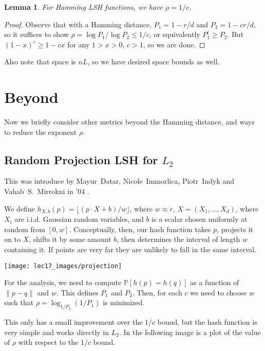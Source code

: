\documentclass[11pt]{article}
\newtheorem{lemma}[theorem]{Lemma}
\begin{document}
\begin{lemma}
    For Hamming LSH functions, we have $\rho = 1/c$.
\end{lemma}

\begin{proof}
    Observe that with a Hamming distance, $P_1 = 1 - r/d$ and $P_2 = 1 - cr/d$, so it suffices to show $\rho = \log P_1 / \log P_2 \leq 1/c$, or equivalently $P_1^c \geq P_2$. But $(1-x)^c \geq 1-cx$ for any $1 > x > 0$, $c > 1$, so we are done.
\end{proof}

Also note that space is $nL$, so we have desired space bounds as well.

\section{Beyond}

Now we briefly consider other metrics beyond the Hamming distance, and ways to reduce the exponent $\rho$.

\subsection{Random Projection LSH for $L_2$}

This was introduce by
Mayur~Datar, Nicole~Immorlica, Piotr~Indyk and Vahab~S.~Mirrokni in '04  \cite{diim04}.

We define $h_{X,b}(p) = \lfloor (p \cdot X + b)/w \rfloor$, where $w \approx r$, $X = (X_1, \ldots, X_d)$, where $X_i$ are i.i.d. Gaussian random variables, and $b$ is a scalar chosen uniformly at random from $[0, w]$. Conceptually, then, our hash function takes $p$, projects it on to $X$, shifts it by some amount $b$, then determines the interval of length $w$ containing it. If points are very far they are unlikely to fall in the same interval. 

\begin{center}
    \texttt{[image: lec17\_images/projection]}
\end{center}

For the analysis, we need to compute $\mathbb{P}[h(p) = h(q)]$ as a function of $\| p-q\|$ and $w$. This defines $P_1$ and $P_2$. Then, for each $c$ we need to choose $w$ such that $\rho = \log_{1/P_2} (1/P_1)$ is minimized.

This only has a small improvement over the $1/c$ bound, but the hash function is very simple and works directly in $L_2$. In the following image is a plot of the value of $\rho$ with respect to the $1/c$ bound.
\end{document}
